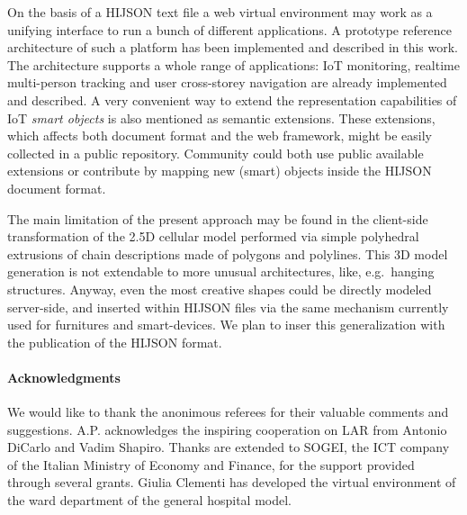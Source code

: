 \documentclass[]{egpubl}
\begin{document}
On the basis of a HIJSON text file a  web virtual
environment may work as a unifying interface to run a bunch of
different applications. A prototype reference architecture of such a platform has been
 implemented and described in this work. The architecture supports a whole
range of applications: IoT monitoring, realtime multi-person tracking and user
cross-storey navigation are already implemented and described. A very
convenient way to extend the representation capabilities of IoT \emph{smart objects} is
also mentioned as semantic extensions. These extensions, which affects both
document format and the web framework, might be easily collected in a public
repository. Community could both use public available extensions or contribute
by mapping new (smart) objects inside the HIJSON document format.

The main limitation of the present approach may be found in the client-side transformation of the 2.5D cellular model performed via simple polyhedral extrusions of chain descriptions made of polygons and polylines. This 3D model generation is not extendable to more unusual architectures, like, e.g.~hanging structures. Anyway, even the most creative shapes could be directly modeled server-side, and inserted within HIJSON files via the same mechanism currently used for furnitures and smart-devices. We plan to inser this generalization with the publication of the HIJSON format.


\paragraph*{Acknowledgments}

We would like to thank the anonimous referees for their valuable comments and suggestions.
A.P. acknowledges the inspiring cooperation on LAR from Antonio DiCarlo and Vadim Shapiro. Thanks are extended to SOGEI, the ICT company of the Italian Ministry of Economy and Finance, for the support provided through several grants. Giulia Clementi has developed the virtual environment of the ward department of the general hospital model. 


\balance

%



\end{document}
